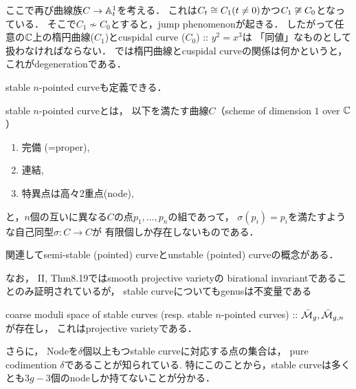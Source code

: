 \documentclass[a4paper]{jsarticle}
\begin{document}
    ここで再び曲線族$C \to \mathbb{A}^1_t$を考える．
    これは$C_t \cong C_1 (t \neq 0)$かつ$C_1 \not \cong C_0$となっている．
    そこで$C_1 \not \sim C_0$とすると，jump phenomenonが起きる．
    したがって任意の$\mathbb{C}$上の楕円曲線($C_1$)とcuspidal curve ($C_0$) :: $y^2=x^3$は
    「同値」なものとして扱わなければならない．
    では楕円曲線とcuspidal curveの関係は何かというと，
    これがdegenerationである．

    stable $n$-pointed curveも定義できる．
    \begin{Def}
        stable $n$-pointed curveとは，
        以下を満たす曲線$C$（scheme of dimension $1$ over $\mathbb{C}$）
        \begin{enumerate}
            \item 完備 (=proper),
            \item 連結,
            \item 特異点は高々2重点(node),
        \end{enumerate}
        と，$n$個の互いに異なる$C$の点$p_1,\dots,p_n$の組であって，
        $\sigma(p_i)=p_i$を満たすような自己同型$\sigma: C \to C$が
        有限個しか存在しないものである．
    \end{Def}
    関連してsemi-stable (pointed) curveとunstable (pointed) curveの概念がある．

    なお，\cite{HarAG} II, Thm8.19ではsmooth projective varietyの
    birational invariantであることのみ証明されているが，
    stable curveについてもgenusは不変量である

    \begin{Thm}
        coarse moduli space of stable curves (resp. stable $n$-pointed curves)
        :: $\bar{\mathcal{M}}_g, \bar{\mathcal{M}}_{g,n}$が存在し，
        これはprojective varietyである．
    \end{Thm}
    さらに，
    Nodeを$\delta$個以上もつstable curveに対応する点の集合は，
    pure codimention $\delta$であることが知られている.
    特にこのことから，stable curveは多くとも$3g-3$個のnodeしか持てないことが分かる．



\end{document}
